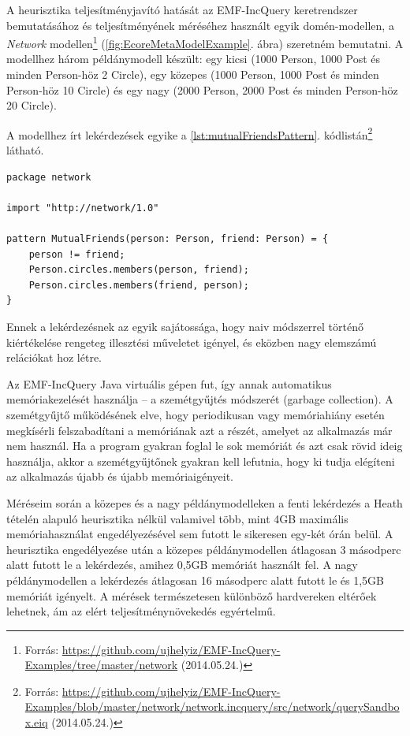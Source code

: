 A heurisztika teljesítményjavító hatását az EMF-IncQuery keretrendszer bemutatásához és teljesítményének méréséhez használt egyik domén-modellen, a \emph{Network} modellen\footnote{\raggedright Forrás: \url{https://github.com/ujhelyiz/EMF-IncQuery-Examples/tree/master/network} (2014.05.24.)} (\ref{fig:EcoreMetaModelExample}. ábra) szeretném bemutatni.
A modellhez három példánymodell készült: egy kicsi (1000 Person, 1000 Post és minden Person-höz 2 Circle), egy közepes (1000 Person, 1000 Post és minden Person-höz 10 Circle) és egy nagy (2000 Person, 2000 Post és minden Person-höz 20 Circle).

A modellhez írt lekérdezések egyike a \ref{lst:mutualFriendsPattern}. kódlistán\footnote{\raggedright Forrás: \url{https://github.com/ujhelyiz/EMF-IncQuery-Examples/blob/master/network/network.incquery/src/network/querySandbox.eiq} (2014.05.24.)} látható.
\begin{lstlisting}[float,floatplacement=htb,caption=MutualFriends minta,label=lst:mutualFriendsPattern]
package network

import "http://network/1.0"

pattern MutualFriends(person: Person, friend: Person) = {
	person != friend;
	Person.circles.members(person, friend);
	Person.circles.members(friend, person);
}
\end{lstlisting}
Ennek a lekérdezésnek az egyik sajátossága, hogy naiv módszerrel történő kiértékelése rengeteg illesztési műveletet igényel, és eközben nagy elemszámú relációkat hoz létre.

Az EMF-IncQuery Java virtuális gépen fut, így annak automatikus memóriakezelését használja -- a szemétgyűjtés módszerét (garbage collection).
A szemétgyűjtő működésének elve, hogy periodikusan vagy memóriahiány esetén megkísérli felszabadítani a memóriának azt a részét, amelyet az alkalmazás már nem használ.
Ha a program gyakran foglal le sok memóriát és azt csak rövid ideig használja, akkor a szemétgyűjtőnek gyakran kell lefutnia, hogy ki tudja elégíteni az alkalmazás újabb és újabb memóriaigényeit.
 
Méréseim során a közepes és a nagy példánymodelleken a fenti lekérdezés a Heath tételén alapuló heurisztika nélkül valamivel több, mint 4GB maximális memóriahasználat engedélyezésével sem futott le sikeresen egy-két órán belül.
A heurisztika engedélyezése után a közepes példánymodellen átlagosan 3 másodperc alatt futott le a lekérdezés, amihez 0,5GB memóriát használt fel. A nagy példánymodellen a lekérdezés átlagosan 16 másodperc alatt futott le és 1,5GB memóriát igényelt.
A mérések természetesen különböző hardvereken eltérőek lehetnek, ám az elért teljesítménynövekedés egyértelmű.
